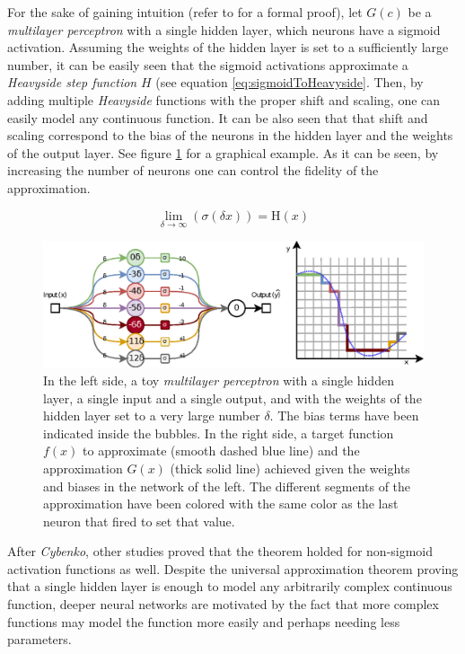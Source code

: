 For the sake of gaining intuition (refer to \cite{Cybenko1989} for a formal proof), let $G(c)$ be a \textit{multilayer perceptron} with a single hidden layer, which neurons have a sigmoid activation. Assuming the weights of the hidden layer is set to a sufficiently large number, it can be easily seen that the sigmoid activations approximate a \textit{Heavyside step function} $H$ (see equation \ref{eq:sigmoidToHeavyside}. Then, by adding multiple \textit{Heavyside} functions with the proper shift and scaling, one can easily model any continuous function. It can be also seen that that shift and scaling correspond to the bias of the neurons in the hidden layer and the weights of the output layer. See figure \ref{fig:universalapprox} for a graphical example. As it can be seen, by increasing the number of neurons one can control the fidelity of the approximation.


\begin{equation}
	\label{eq:sigmoidToHeavyside}
	\lim_{\delta \rightarrow \infty} (\sigma(\delta x)) = \mathrm{H}(x)
\end{equation}

\begin{figure}
	\centering
	\includegraphics[width=0.7\linewidth]{chapter2/images/universalapprox}
	\caption{In the left side, a toy \textit{multilayer perceptron} with a single hidden layer, a single input and a single output, and with the weights of the hidden layer set to a very large number $\delta$. The bias terms have been indicated inside the bubbles. In the right side, a target function $f(x)$ to approximate (smooth dashed blue line) and the approximation $G(x)$ (thick solid line) achieved given the weights and biases in the network of the left. The different segments of the approximation have been colored with the same color as the last neuron that fired to set that value.}
	\label{fig:universalapprox}
\end{figure}

After \textit{Cybenko}, other studies \cite{Leshno1993, pinkus1999} proved that the theorem holded for non-sigmoid activation functions as well. Despite the universal approximation theorem proving that a single hidden layer is enough to model any arbitrarily complex continuous function, deeper neural networks are motivated by the fact that more complex functions may model the function more easily and perhaps needing less parameters.



